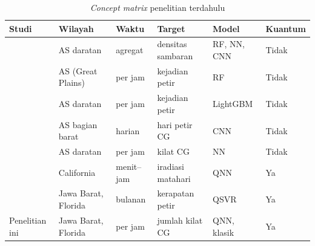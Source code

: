 \begin{table}[h]
\centering
\captionsetup{justification=centering}
\caption{\textit{Concept matrix} penelitian terdahulu}
\label{tbl:tabelConceptMatrix}
\footnotesize
\setlength{\tabcolsep}{4pt}
\begin{tabular}{| p{2.3cm} | p{2.3cm} | p{1.5cm} | p{2.3cm} | p{1.8cm} | p{1.5cm} |}
\hline
\textbf{Studi} & \textbf{Wilayah} & \textbf{Waktu} & \textbf{Target} & \textbf{Model} & \textbf{Kuantum} \\
\hline
\cite{cheng2024MLLP} & AS daratan & agregat & densitas sambaran & RF, NN, CNN & Tidak \\
\cite{shanTBDMLI} & AS (Great Plains) & per jam & kejadian petir & RF & Tidak \\
\cite{song2023LNAI} & AS daratan & per jam & kejadian petir & LightGBM & Tidak \\
\cite{kalashnikov2024PCG} & AS bagian barat & harian & hari petir CG & CNN & Tidak \\
\cite{sobash2025MLP} & AS daratan & per jam & kilat CG & NN & Tidak \\
\cite{oliveira2024QNN} & California & menit--jam & iradiasi matahari & QNN & Ya \\
\cite{fadhil2025} & Jawa Barat, Florida & bulanan & kerapatan petir & QSVR & Ya \\
Penelitian ini & Jawa Barat, Florida & per jam & jumlah kilat CG & QNN, klasik & Ya \\
\hline
\end{tabular}
\end{table}
